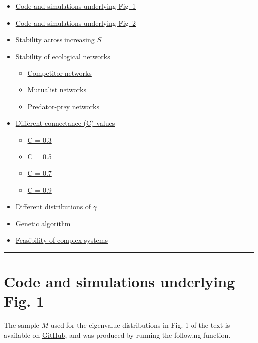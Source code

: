 \documentclass[]{article}
\providecommand{\tightlist}{%
  \setlength{\itemsep}{0pt}\setlength{\parskip}{0pt}}
\providecommand{\tightlist}{%
  \setlength{\itemsep}{0pt}\setlength{\parskip}{0pt}}
\begin{document}
\begin{itemize}
\tightlist
\item
  \protect\hyperlink{Fig1}{Code and simulations underlying Fig. 1}
\item
  \protect\hyperlink{Fig2}{Code and simulations underlying Fig. 2}
\item
  \protect\hyperlink{IncrS}{Stability across increasing \(S\)}
\item
  \protect\hyperlink{ecological}{Stability of ecological networks}

  \begin{itemize}
  \tightlist
  \item
    \protect\hyperlink{competition}{Competitor networks}
  \item
    \protect\hyperlink{mutualism}{Mutualist networks}
  \item
    \protect\hyperlink{pred-prey}{Predator-prey networks}
  \end{itemize}
\item
  \protect\hyperlink{connectance}{Different connectance (C) values}

  \begin{itemize}
  \tightlist
  \item
    \protect\hyperlink{connect3}{C = 0.3}
  \item
    \protect\hyperlink{connect5}{C = 0.5}
  \item
    \protect\hyperlink{connect7}{C = 0.7}
  \item
    \protect\hyperlink{connect9}{C = 0.9}
  \end{itemize}
\item
  \protect\hyperlink{gam_dist}{Different distributions of \(\gamma\)}
\item
  \protect\hyperlink{ga}{Genetic algorithm}
\item
  \protect\hyperlink{Feasibility}{Feasibility of complex systems}
\end{itemize}

\begin{center}\rule{0.5\linewidth}{\linethickness}\end{center}

\hypertarget{Fig1}{\section{Code and simulations underlying Fig.
1}\label{Fig1}}

The sample \(M\) used for the eigenvalue distributions in Fig. 1 of the
text is available on
\href{https://github.com/bradduthie/random_matrix_stability/tree/master/sim_results/bi_gamma}{GitHub},
and was produced by running the following function.
\end{document}
